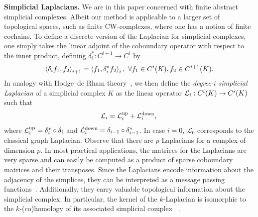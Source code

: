 \textbf{Simplicial Laplacians.} We are in this paper concerned with finite abstract simplicial complexes. Albeit our method is applicable to a larger set of topological spaces, such as finite CW-complexes, where one has a notion of finite cochains. 
To define a discrete version of the Laplacian for simplicial complexes, one simply takes the linear adjoint of the coboundary operator with respect to the inner product, defining $\delta_i^\ast:C^{i+1}\to C^i$ by
\begin{equation*}
  \left\langle \delta_i f_1 , f_2 \right\rangle_{i+1} =\left\langle f_1 , \delta_i^\ast f_2 \right\rangle_{i},\ \forall f_1\in C^{i}(K), f_2 \in C^{i+1}(K).
\end{equation*}
In analogy with Hodge--de Rham theory~\cite{madsen1997calculus}, we then define the \emph{degree-$i$ simplicial Laplacian} of a simplicial complex $K$ as the linear operator $\mathcal{L}_i:C^i(K)\to C^i(K)$ such that
\begin{equation*}
  \mathcal{L}_i = \mathcal{L}^{\text{up}}_i + \mathcal{L}^{\text{down}}_i,\\
\end{equation*}
where $\mathcal{L}^{\text{up}}_i =  \delta_{i}^\ast\circ\delta_{i}$ and $\mathcal{L}^{\text{down}}_i = \delta_{i-1}\circ\delta_{i-1}^\ast$. In case $i=0$, $\mathcal{L}_0$ corresponds to the classical graph Laplacian. Observe that there are $p$ Laplacians for a complex of dimension $p$. In most practical applications, the matrices for the Laplacians are very sparse and can easily be computed as a product of sparse coboundary matrices and their transposes. Since the Laplacians encode information about the adjacency of the simplices, they can be interpreted as a message passing functions~\cite{gilmer2017NeuralMP}. Additionally, they carry valuable topological information about the simplicial complex. In particular, the kernel of the $k$-Laplacian is isomorphic to the $k$-(co)homology of its associated simplicial complex ~\cite{eckmann1944,horak2013spectra}.
